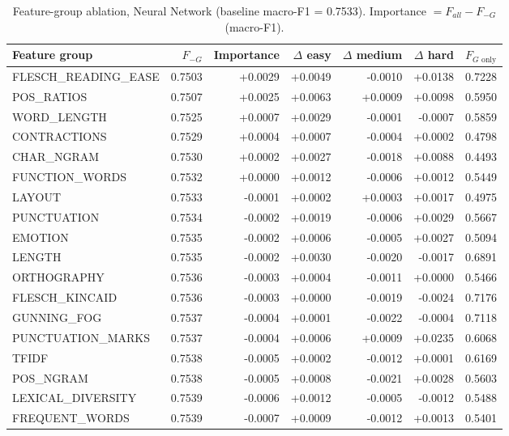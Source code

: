 \begin{table}[ht]
\centering
\small
\caption{Feature-group ablation, Neural Network (baseline macro-F1 = 0.7533). Importance $= F_{all} - F_{-G}$ (macro-F1).}
\label{tab:ablation-features-neural}
\begin{tabular}{lrrrrrr}
\toprule
Feature group & $F_{-G}$ & Importance & $\Delta$ easy & $\Delta$ medium & $\Delta$ hard & $F_{G\text{ only}}$ \\
\midrule
FLESCH\_READING\_EASE & 0.7503 & +0.0029 & +0.0049 & -0.0010 & +0.0138 & 0.7228 \\
POS\_RATIOS & 0.7507 & +0.0025 & +0.0063 & +0.0009 & +0.0098 & 0.5950 \\
WORD\_LENGTH & 0.7525 & +0.0007 & +0.0029 & -0.0001 & -0.0007 & 0.5859 \\
CONTRACTIONS & 0.7529 & +0.0004 & +0.0007 & -0.0004 & +0.0002 & 0.4798 \\
CHAR\_NGRAM & 0.7530 & +0.0002 & +0.0027 & -0.0018 & +0.0088 & 0.4493 \\
FUNCTION\_WORDS & 0.7532 & +0.0000 & +0.0012 & -0.0006 & +0.0012 & 0.5449 \\
LAYOUT & 0.7533 & -0.0001 & +0.0002 & +0.0003 & +0.0017 & 0.4975 \\
PUNCTUATION & 0.7534 & -0.0002 & +0.0019 & -0.0006 & +0.0029 & 0.5667 \\
EMOTION & 0.7535 & -0.0002 & +0.0006 & -0.0005 & +0.0027 & 0.5094 \\
LENGTH & 0.7535 & -0.0002 & +0.0030 & -0.0020 & -0.0017 & 0.6891 \\
ORTHOGRAPHY & 0.7536 & -0.0003 & +0.0004 & -0.0011 & +0.0000 & 0.5466 \\
FLESCH\_KINCAID & 0.7536 & -0.0003 & +0.0000 & -0.0019 & -0.0024 & 0.7176 \\
GUNNING\_FOG & 0.7537 & -0.0004 & +0.0001 & -0.0022 & -0.0004 & 0.7118 \\
PUNCTUATION\_MARKS & 0.7537 & -0.0004 & +0.0006 & +0.0009 & +0.0235 & 0.6068 \\
TFIDF & 0.7538 & -0.0005 & +0.0002 & -0.0012 & +0.0001 & 0.6169 \\
POS\_NGRAM & 0.7538 & -0.0005 & +0.0008 & -0.0021 & +0.0028 & 0.5603 \\
LEXICAL\_DIVERSITY & 0.7539 & -0.0006 & +0.0012 & -0.0005 & -0.0012 & 0.5488 \\
FREQUENT\_WORDS & 0.7539 & -0.0007 & +0.0009 & -0.0012 & +0.0013 & 0.5401 \\
\bottomrule
\end{tabular}
\end{table}

